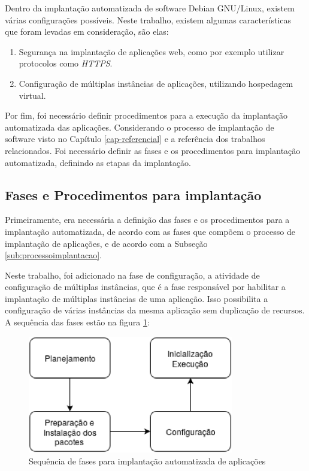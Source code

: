 Dentro da implantação automatizada de software Debian GNU/Linux, existem várias
configurações possíveis. Neste trabalho, existem algumas características que foram 
levadas em consideração, são elas:

\begin{enumerate}
  \item  Segurança na implantação de aplicações web,
   como por exemplo utilizar protocolos como \textit{HTTPS}.
  \item  Configuração de múltiplas instâncias de
   aplicações, utilizando hospedagem virtual.
\end{enumerate}

Por fim, foi necessário definir procedimentos para a execução da implantação 
automatizada das aplicações. Considerando
o processo de implantação de software visto no Capítulo \ref{cap-referencial}
e a referência dos trabalhos relacionados. Foi necessário definir as fases e os
procedimentos para implantação automatizada, definindo as etapas
da implantação.

\subsection{Fases e Procedimentos para implantação}
\label{sec:fases}

Primeiramente, era necessária a definição das fases e os procedimentos para a implantação 
automatizada, de acordo com as fases que compõem o processo de 
implantação de aplicações, e de acordo com a Subseção \ref{sub:processoimplantacao}. 

Neste trabalho, foi adicionado na fase de configuração, a atividade de configuração de múltiplas
instâncias, que é a fase responsável por habilitar a implantação de múltiplas 
instâncias de uma aplicação. Isso possibilita a configuração de várias instâncias da mesma aplicação sem duplicação de recursos. A sequência
das fases estão na figura \ref{fig:1}:

\begin{figure}[h]
  \centering
  \includegraphics[width=0.8\textwidth]
      {figuras/fases}
      \caption{Sequência de fases para implantação automatizada de aplicações}
  \label{fig:1}
\end{figure}

